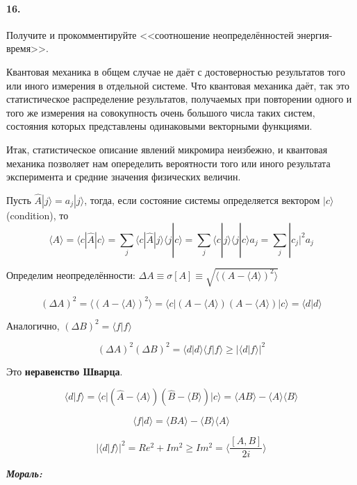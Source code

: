 


	
	\paragraph{16.}
	Получите и прокомментируйте <<соотношение неопределённостей энергия-время>>.
	
	Квантовая механика в общем случае не даёт с достоверностью результатов того или иного измерения в отдельной системе. Что квантовая механика даёт, так это статистическое распределение результатов, получаемых при повторении одного и того же измерения на совокупность очень большого числа таких систем, состояния которых представлены одинаковыми векторными функциями.
	
	Итак, статистическое описание явлений микромира неизбежно, и квантовая механика позволяет нам опеределить вероятности того или иного результата эксперимента и средние значения физических величин.
	
	Пусть $\hat{A} |j\rangle = a_j |j\rangle$, тогда, если состояние системы определяется вектором $|c\rangle$ (condition), то 
	$$\langle A \rangle = \langle c | \hat{A} | c \rangle = \sum_{j}^{} \langle c | \hat{A} | j \rangle \langle j | c \rangle = \sum_{j} \langle c | j \rangle \langle j | c \rangle a_j = \sum_{j} |c_j|^2 a_j$$
	
	Определим неопределённости: $\Delta A \equiv \sigma[A] \equiv \sqrt{\langle(A-\langle A \rangle)^2\rangle} $
	
	$$(\Delta A)^2 = \langle(A-\langle A \rangle)^2\rangle = \langle c | (A - \langle A \rangle)(A - \langle A \rangle) | c \rangle = \langle d | d \rangle $$
	
	Аналогично, $(\Delta B)^2 = \langle f | f \rangle$
	
	$$(\Delta A)^2 (\Delta B)^2 = \langle d | d \rangle \langle f | f \rangle \geqslant | \langle d | f \rangle |^2 $$
	
	Это \textbf{неравенство Шварца}.
	
	$$\langle d | f \rangle = \langle c | (\hat{A} - \langle A \rangle)(\hat{B} - \langle B \rangle) | c \rangle = \langle AB \rangle - \langle A \rangle \langle B \rangle$$	
	
	$$\langle f | d \rangle = \langle BA \rangle - \langle B \rangle \langle A \rangle$$
	
	$$ | \langle d | f \rangle |^2 = Re^2 +Im^2 \geqslant Im^2 = \langle \frac{[A,B]}{2i} \rangle$$
	
	\textbf{\textit{Мораль:}} 
	
